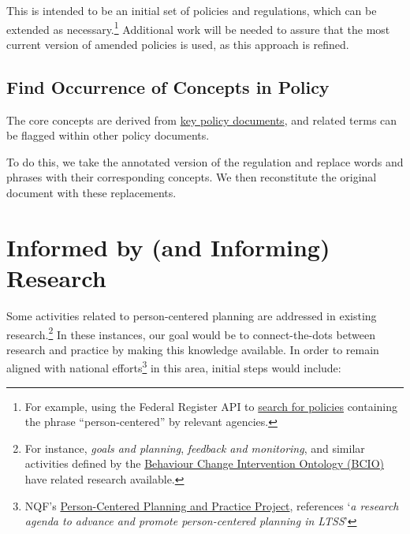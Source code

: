 \documentclass[
]{book}
\begin{document}
This is intended to be an initial set of policies and regulations, which can be extended as necessary.\footnote{For example, using the Federal Register API to \href{https://www.federalregister.gov/documents/search?conditions\%5Bagencies\%5D\%5B\%5D=centers-for-medicare-medicaid-services\&conditions\%5Bagencies\%5D\%5B\%5D=health-and-human-services-department\&conditions\%5Bagencies\%5D\%5B\%5D=substance-abuse-and-mental-health-services-administration\&conditions\%5Bterm\%5D=person-centered\&conditions\%5Btype\%5D\%5B\%5D=RULE\#}{search for policies} containing the phrase ``person-centered'' by relevant agencies.} Additional work will be needed to assure that the most current version of amended policies is used, as this approach is refined.

\hypertarget{find-occurrence-of-concepts-in-policy}{%
\section{Find Occurrence of Concepts in Policy}\label{find-occurrence-of-concepts-in-policy}}

The core concepts are derived from \protect\hyperlink{policy}{key policy documents}, and related terms can be flagged within other policy documents.

To do this, we take the annotated version of the regulation and replace words and phrases with their corresponding concepts. We then reconstitute the original document with these replacements.

\hypertarget{research}{%
\chapter{Informed by (and Informing) Research}\label{research}}

Some activities related to person-centered planning are addressed in existing research.\footnote{For instance, \emph{goals and planning}, \emph{feedback and monitoring}, and similar activities defined by the \href{https://www.humanbehaviourchange.org/resources/behavioural-science/25/description}{Behaviour Change Intervention Ontology (BCIO)} have related research available.} In these instances, our goal would be to connect-the-dots between research and practice by making this knowledge available. In order to remain aligned with national efforts\footnote{NQF's \href{http://www.qualityforum.org/WorkArea/linkit.aspx?LinkIdentifier=id\&ItemID=91382}{Person-Centered Planning and Practice Project}, references `\emph{a research agenda to advance and promote person-centered planning in LTSS}'} in this area, initial steps would include:
\end{document}
